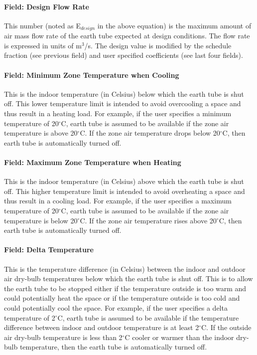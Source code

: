\paragraph{Field: Design Flow Rate}\label{field-design-flow-rate-4}

This number (noted as E\(_{design}\) in the above equation) is the maximum amount of air mass flow rate of the earth tube expected at design conditions. The flow rate is expressed in units of m\(^{3}\)/s. The design value is modified by the schedule fraction (see previous field) and user specified coefficients (see last four fields).

\paragraph{Field: Minimum Zone Temperature when Cooling}\label{field-minimum-zone-temperature-when-cooling}

This is the indoor temperature (in Celsius) below which the earth tube is shut off. This lower temperature limit is intended to avoid overcooling a space and thus result in a heating load. For example, if the user specifies a minimum temperature of 20$^\circ$C, earth tube is assumed to be available if the zone air temperature is above 20$^\circ$C. If the zone air temperature drops below 20$^\circ$C, then earth tube is automatically turned off.

\paragraph{Field: Maximum Zone Temperature when Heating}\label{field-maximum-zone-temperature-when-heating}

This is the indoor temperature (in Celsius) above which the earth tube is shut off. This higher temperature limit is intended to avoid overheating a space and thus result in a cooling load. For example, if the user specifies a maximum temperature of 20$^\circ$C, earth tube is assumed to be available if the zone air temperature is below 20$^\circ$C. If the zone air temperature rises above 20$^\circ$C, then earth tube is automatically turned off.

\paragraph{Field: Delta Temperature}\label{field-delta-temperature-4}

This is the temperature difference (in Celsius) between the indoor and outdoor air dry-bulb temperatures below which the earth tube is shut off. This is to allow the earth tube to be stopped either if the temperature outside is too warm and could potentially heat the space or if the temperature outside is too cold and could potentially cool the space. For example, if the user specifies a delta temperature of 2$^\circ$C, earth tube is assumed to be available if the temperature difference between indoor and outdoor temperature is at least 2$^\circ$C. If the outside air dry-bulb temperature is less than 2$^\circ$C cooler or warmer than the indoor dry-bulb temperature, then the earth tube is automatically turned off.

